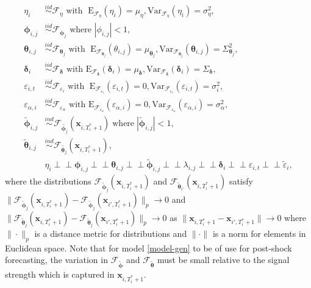 \documentclass[11pt]{article}
\newcommand{\x}{\textbf{x}}
\newcommand{\simiid}{\stackrel{iid}{\sim}} %
\newcommand{\indep}{\perp \!\!\! \perp } %
\def\mrm#1{\mathrm{#1}} %
\def\t#1{\tilde{#1}} %
\def\mc#1{\mathcal{#1}} %
\def\mc#1{\mathcal{#1}}
\theoremstyle{definition}
\begin{document}
\begin{equation} \label{random-effects}
\begin{split}
  \eta_i &\simiid \mc{F}_{\eta} \text{ with }  \; \mrm{E}_{\mc{F}_{\eta}}(\eta_i) = \mu_\eta, \mrm{Var}_{\mc{F}_{\eta}}(\eta_i)  = \sigma^2_{\eta}, \\
  \mathbf{\phi}_{i,j} &\simiid \mc{F}_{\mathbf{\phi}_j} \text{ where } |\phi_{i,j}| < 1, \\
  \mathbf{\theta}_{i,j} &\simiid \mc{F}_{\mathbf{\theta}_j} \text{ with }  \; \mrm{E}_{\mc{F}_{\mathbf{\theta}_j}}(\theta_{i,j}) = \mu_{\mathbf{\theta}_j}, \mrm{Var}_{\mc{F}_{\mathbf{\theta}_j}}(\mathbf{\theta}_{i,j})  = \Sigma^2_{\mathbf{\theta}_j}, \\
  \mathbf{\delta}_i &\simiid  \mc{F}_{\mathbf{\delta}} \text{ with } \mrm{E}_{\mc{F}_{\mathbf{\delta}}}(\mathbf{\delta}_i)=\mu_{\mathbf{\delta}}, \mrm{Var}_{\mc{F}_{\mathbf{\delta}}}(\mathbf{\delta}_i)=\Sigma_{\mathbf{\delta}}, \\
\varepsilon_{i,t} & \simiid  \mc{F}_{\varepsilon_i} \text{ with }  \; \mrm{E}_{\mc{F}_{\varepsilon_i}}(\varepsilon_{i,t}) = 0, \mrm{Var}_{\mc{F}_{\varepsilon_i}}(\varepsilon_{i,t})  = \sigma^2_i,  \\
\varepsilon_{\alpha, i} &\simiid  \mc{F}_{\varepsilon_\alpha} \text{ with }\mrm{E}_{\mc{F}_{\varepsilon_\alpha}}(\varepsilon_{\alpha, i})=0, \mrm{Var}_{\mc{F}_{\varepsilon_{\alpha}}}(\varepsilon_{\alpha, i})=\sigma^2_{\alpha}, \\
  \tilde{\mathbf{\phi}}_{i,j} &\overset{ind}{\sim} \mathcal{F}_{\tilde{\mathbf{\phi}_j}}(\x_{i,T_i^*+1}) \; \text{where} \; |\tilde{\mathbf{\phi}}_{i,j}| < 1,  \\
  \tilde{\mathbf{\theta}}_{i,j} &\overset{ind}{\sim} \mathcal{F}_{\tilde{\mathbf{\theta}_j}}(\x_{i,T_i^*+1}),  \\  
&\eta_i \indep \mathbf{\phi}_{i,j} \indep \mathbf{\theta}_{i,j} \indep 
\tilde{\mathbf{\phi}}_{i,j} \indep \lambda_{i,j} \indep \mathbf{\delta}_i \indep \varepsilon_{i,t} \indep \tilde\varepsilon_{i}, 
\end{split}
\end{equation}
where the distributions $\mathcal{F}_{\tilde{\mathbf{\phi}}_j}(\x_{i,T_i^*+1})$ and $\mathcal{F}_{\tilde{\mathbf{\theta}}_{i'}}(\x_{i,T_i^*+1})$ satisfy 
$\|\mathcal{F}_{\tilde{\mathbf{\phi}}_j}(\x_{i,T_i^*+1}) - \mathcal{F}_{\tilde{\mathbf{\phi}}_{j}}(\x_{i',T_i^*+1})\|_p \to 0$ and $\|\mathcal{F}_{\tilde{\mathbf{\theta}}_j}(\x_{i,T_i^*+1}) - \mathcal{F}_{\tilde{\mathbf{\theta}}_{j}}(\x_{i',T_i^*+1})\|_p \to 0$ as $\|\x_{i,T_i^*+1} - \x_{i',T_i^*+1}\| \to 0$ where $\|\cdot\|_p$ is a distance metric for distributions and $\|\cdot\|$ is a norm for elements in Euclidean space. Note that for model \eqref{model-gen} to be of use for post-shock forecasting, the variation in $\mathcal{F}_{\tilde{\mathbf{\phi}}}$ and $\mathcal{F}_{\tilde{\mathbf{\theta}}}$ must be small relative to the signal strength which is captured in $\x_{i,T^*_i+1}$.
\end{document}
